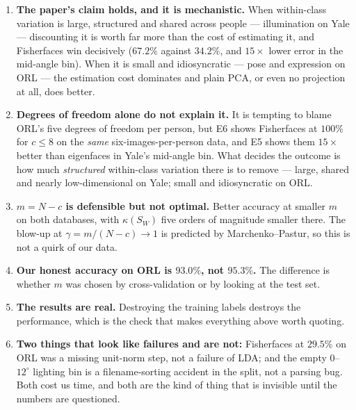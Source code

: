 \documentclass[11pt]{article}
\theoremstyle{remark}
\newcommand{\Sw}{S_W}
\begin{document}
\begin{enumerate}[leftmargin=1.4em,itemsep=3pt]

\item \textbf{The paper's claim holds, and it is mechanistic.} When
within-class variation is large, structured and shared across people ---
illumination on Yale --- discounting it is worth far more than the cost of
estimating it, and Fisherfaces win decisively ($67.2\%$ against $34.2\%$, and
$15\times$ lower error in the mid-angle bin). When it is small and
idiosyncratic --- pose and expression on ORL --- the estimation cost dominates
and plain PCA, or even no projection at all, does better.

\item \textbf{Degrees of freedom alone do not explain it.} It is tempting to
blame ORL's five degrees of freedom per person, but E6 shows Fisherfaces at
$100\%$ for $c\le8$ on the \emph{same} six-images-per-person data, and E5 shows
them $15\times$ better than eigenfaces in Yale's mid-angle bin. What decides
the outcome is how much \emph{structured} within-class variation there is to
remove --- large, shared and nearly low-dimensional on Yale; small and
idiosyncratic on ORL.

\item \textbf{$m=N-c$ is defensible but not optimal.} Better accuracy at
smaller $m$ on both databases, with $\kappa(\Sw)$ five orders of magnitude
smaller there. The blow-up at $\gamma=m/(N-c)\to1$ is predicted by
Marchenko--Pastur, so this is not a quirk of our data.

\item \textbf{Our honest accuracy on ORL is $93.0\%$, not $95.3\%$.} The
difference is whether $m$ was chosen by cross-validation or by looking at the
test set.

\item \textbf{The results are real.} Destroying the training labels destroys
the performance, which is the check that makes everything above worth quoting.

\item \textbf{Two things that look like failures and are not:} Fisherfaces at
$29.5\%$ on ORL was a missing unit-norm step, not a failure of LDA; and the
empty $0$--$12^\circ$ lighting bin is a filename-sorting accident in the split,
not a parsing bug. Both cost us time, and both are the kind of thing that is
invisible until the numbers are questioned.
\end{enumerate}

\end{document}
